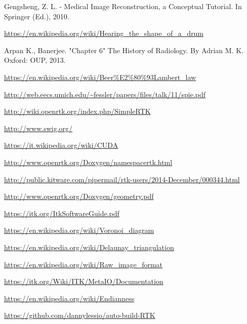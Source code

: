 \documentclass[a4paper,12pt, doubleside]{report}
\begin{document}
\begin{thebibliography}{1}
        Gengsheng, Z. L. - Medical Image Reconstruction, a Conceptual Tutorial. In Springer (Ed.), 2010.
    
        \url{https://en.wikipedia.org/wiki/Hearing_the_shape_of_a_drum}
    
        Arpan K., Banerjee. "Chapter 6" The History of Radiology. By Adrian M. K. Oxford: OUP, 2013.
        
        \url{https://en.wikipedia.org/wiki/Beer%E2%80%93Lambert_law}
        
        \url{http://web.eecs.umich.edu/~fessler/papers/files/talk/11/spie.pdf}    
        
        \url{http://wiki.openrtk.org/index.php/SimpleRTK}
        
        \url{http://www.swig.org/}    
        
        \url{https://it.wikipedia.org/wiki/CUDA}
        
        \url{http://www.openrtk.org/Doxygen/namespacertk.html}
        
        \url{http://public.kitware.com/pipermail/rtk-users/2014-December/000344.html}
    
        \url{http://www.openrtk.org/Doxygen/geometry.pdf}
        
        \url{https://itk.org/ItkSoftwareGuide.pdf}   
        
        \url{https://en.wikipedia.org/wiki/Voronoi_diagram}
        
        \url{https://en.wikipedia.org/wiki/Delaunay_triangulation}
    
        \url{https://en.wikipedia.org/wiki/Raw_image_format}
    
        \url{https://itk.org/Wiki/ITK/MetaIO/Documentation} 
    
        \url{https://en.wikipedia.org/wiki/Endianness}
    
    
    
   

    
    
    
        \url{https://github.com/dannylessio/auto-build-RTK}


\end{thebibliography}
\end{document}
